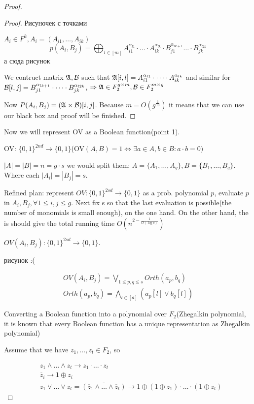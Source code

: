 \begin{proof}
\begin{proof}
		{\color{red} Рисуночек с точками}

		$A_i \in F^k, A_i = (A_{i 1}, \dots, A_{i k})$
		\[
			p(A_i, B_j) = \bigoplus_{l \in [m]} A_{i 1}^{\alpha_{l 1}} \cdot \dots \cdot A_{i k}^{\alpha_{l k}} \cdot B_{j 1}^{\alpha_{l k + 1} } \dots \cdot B_{j k}^{\alpha_{l 2k}}
		\]
		{\color{red} а сюда рисунок}

		We contruct matrix $\mathfrak{A}, \mathcal{B}$ such that $\mathfrak{A}[i, l] = A_{i 1}^{\alpha_{l 1}} \cdot \dots \cdot A_{i k}^{\alpha_{l k}}$ and similar for $\mathcal{B}[l, j] = B_{j 1}^{\alpha_{l k + 1}} \cdot \dots \cdot B_{j k}^{\alpha_{l 2k}}$, $\Rightarrow \mathfrak{A} \in F_2^{g \times m}, \mathcal{B} \in F_2^{m \times g}$

		Now $P(A_i, B_j) = (\mathfrak{A} \times \mathcal{B})[i, j]$. Because $m = O(g^{\frac{1}{10}})$ it means that we can use our black box and proof will be finished.
	\end{proof}

	Now we will represent OV as a Boolean function(point 1).

	OV: $\{0, 1\}^{2nd} \to \{0, 1\}$(OV$(A, B) = 1 \Leftrightarrow \exists a \in A, b \in B : a \cdot b = 0 )$

	$|A| = |B| = n = g \cdot s$ we would split them: $A = \{ A_1, \dots, A_g\}, B = \{B_1, \dots, B_g\}$.
	Where each $|A_i| = |B_j| = s$.

	Refined plan: represent $OV : \{0, 1\}^{2sd} \to \{0, 1\}$ as a prob. polynomial $p$,  evaluate $p$ in $A_i, B_j, \forall 1 \leq i, j \leq g$.
	Next fix s so that the last evaluation is possible(the number of monomials is small enough), on the one hand. On the other hand, the is should give the total running time $O(n^{2 - \frac{1}{O(\log c)}})$

	$OV(A_i, B_j) : \{0, 1\}^{2sd} \to \{0, 1\}$.

	{\color{red} рисунок :(}

	\begin{align*}
		OV(A_i, B_j) = \bigvee_{1 \leq p, q \leq s} Orth(a_p, b_q) \\
		Orth(a_p, b_q) = \bigwedge_{l \in [d]} \left(\overline {a_p[l]} \lor \overline {b_q[l]}\right)
	\end{align*}

	Converting a Boolean function into a polynomial over $F_2$(Zhegalkin polynomial, it is known that every Boolean function has a unique representation as Zhegalkin polynomial)

	Assume that we have $z_1, \dots, z_t \in F_2$, so

	\begin{align*}
		&z_1 \land \dots \land z_t \to z_1 \cdot \dots \cdot z_t \\
		&\overline z_i \to 1 \oplus z_i \\
		&z_1 \lor \dots \lor z_t = \overline{(\overline z_1 \land \dots \land \overline z_t)} \to 1 \oplus (1 \oplus z_1) \cdot \dots \cdot (1 \oplus z_t)
	\end{align*}


\end{proof}
